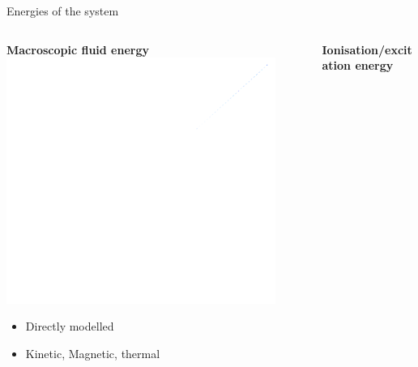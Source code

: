 \documentclass[10pt,aspectratio=169,usenames,dvipsnames]{beamer}
\begin{document}


\begin{frame}{Energies of the system}
\begin{columns}
\begin{column}{0.3\textwidth}
\centering
\textbf{Macroscopic fluid energy}
\includegraphics[width=0.9\textwidth]{2023StAndrewsAstro/Figures/fluidelement.png}
\begin{itemize}
    \item Directly modelled
    \item Kinetic, Magnetic, thermal
\end{itemize}
\end{column}
\begin{column}{0.3\textwidth}
\centering
\textbf{Ionisation/excitation energy}

\end{column}
\end{columns}
\end{frame}
\end{document}
